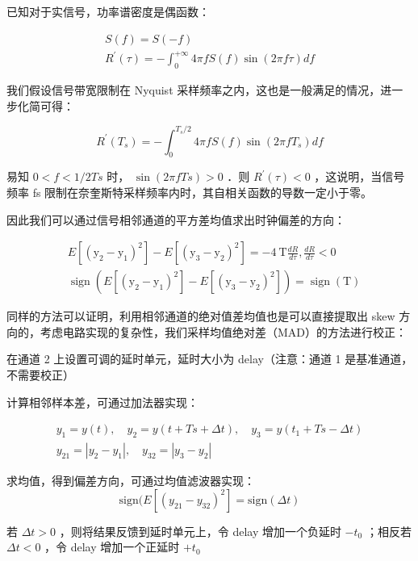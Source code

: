 \documentclass[cs4size,a4paper]{ctexart}
\numberwithin{equation}{section}
\numberwithin{table}{section}
\numberwithin{figure}{section}
\begin{document}
		
		已知对于实信号，功率谱密度是偶函数：
		
		$$
		\begin{gathered}
			S(f)=S(-f) \\
			R^{\prime}(\tau)=-\int_0^{+\infty} 4 \pi f S(f) \sin (2 \pi f \tau) d f
		\end{gathered}
		$$
		
		
		我们假设信号带宽限制在 Nyquist 采样频率之内，这也是一般满足的情况，进一步化简可得：
		
		$$
		R^{\prime}(T_s)=-\int_0^{T_s / 2} 4 \pi f S(f) \sin (2 \pi f T_s) df
		$$
		
		
		易知 $0<f<1 / 2 T s$ 时， $\sin (2 \pi f T s)>0$ ．则 $R^{\prime}(\tau)<0$ ，这说明，当信号频率 fs 限制在奈奎斯特采样频率内时，其自相关函数的导数一定小于零。
		
		因此我们可以通过信号相邻通道的平方差均值求出时钟偏差的方向：
		
		$$
		\begin{aligned}
			& E\left[\left(\mathrm{y}_2-\mathrm{y}_1\right)^2\right]-E\left[\left(\mathrm{y}_3-\mathrm{y}_2\right)^2\right]=-4 \mathrm{~T} \frac{d R}{d \tau},   \frac{d R}{d \tau}<0 \\
			&\operatorname{sign}\left(E\left[\left(\mathrm{y}_2-\mathrm{y}_1\right)^2\right]-E\left[\left(\mathrm{y}_3-\mathrm{y}_2\right)^2\right]\right)=\operatorname{sign}(\mathrm{T})
		\end{aligned}
		$$
		
		
		同样的方法可以证明，利用相邻通道的绝对值差均值也是可以直接提取出 skew 方向的，考虑电路实现的复杂性，我们采样均值绝对差（MAD）的方法进行校正：
		
		在通道 2 上设置可调的延时单元，延时大小为 delay（注意：通道 1 是基准通道，不需要校正）
		
		\noindent
		计算相邻样本差，可通过加法器实现：
		
		$$
		\begin{gathered}
			y_1=y(t), \quad y_2=y(t+T s+\Delta t), \quad y_3=y(t_1+T s-\Delta t) \\
			y_{21}=\left|y_2-y_1\right|, \quad y_{32}=\left|y_3-y_2\right|
		\end{gathered}
		$$
		
		\noindent
		求均值，得到偏差方向，可通过均值滤波器实现：
		\[
		\text{sign}(E[(y_{21} - y_{32})^2] = \text{sign}(\Delta t)
		\]
		
		若 $\Delta t>0$ ，则将结果反馈到延时单元上，令 delay 增加一个负延时 $-t_0$ ；相反若 $\Delta t<0$ ，令 delay 增加一个正延时 $+t_0$
		
\end{document}
